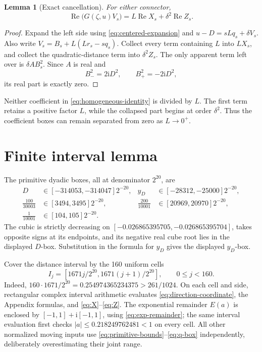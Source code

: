 \documentclass[11pt]{article}
\newtheorem{lemma}[theorem]{Lemma}
\newcommand{\re}{\operatorname{Re}}
\newcommand{\ii}{\mathrm i}
\begin{document}
\begin{lemma}[Exact cancellation]\label{lem:cancellation}
For either connector,
\begin{equation}\label{eq:homogeneous-identity}
 \re\bigl(G(\zeta,u)V_s\bigr)=L\re X_s+\delta^2\re Z_s.
\end{equation}
\end{lemma}

\begin{proof}
Expand the left side using \eqref{eq:centered-expansion} and
\(u-D=sLq_s+\delta V_s\). Also write
\(V_s=B_s+L(Lr_s-sq_s)\). Collect every term containing \(L\) into
\(LX_s\), and collect the quadratic-distance term into \(\delta^2Z_s\).
The only apparent term left over is \(\delta AB_s^2\). Since \(A\) is real and
\[
 B_-^2=2\ii D^2,\qquad B_+^2=-2\ii D^2,
\]
its real part is exactly zero.
\end{proof}

Neither coefficient in \eqref{eq:homogeneous-identity} is divided by \(L\). The first term
retains a positive factor \(L\), while the collapsed part begins at order \(\delta^2\).
Thus the coefficient boxes can remain separated from zero as \(L\to0^+\).

\section{Finite interval lemma}

The primitive dyadic boxes, all at denominator \(2^{20}\), are
\begin{align*}
 D&\in[-314053,-314047]2^{-20},&
 y_D&\in[-28312,-25000]2^{-20},\\
 \frac{100}{30003}&\in[3494,3495]2^{-20},&
 \frac{200}{10001}&\in[20969,20970]2^{-20},\\
 \frac1{10001}&\in[104,105]2^{-20}.&&
\end{align*}
The cubic is strictly decreasing on
\([-0.026865395705,-0.026865395704]\), takes opposite signs at its endpoints,
and its negative real cube root lies in the displayed \(D\)-box. Substitution in the
formula for \(y_D\) gives the displayed \(y_D\)-box.

Cover the distance interval by the 160 uniform cells
\[
 I_j=[1671j/2^{20},1671(j+1)/2^{20}],\qquad 0\leq j<160.
\]
Indeed, \(160\cdot1671/2^{20}=0.254974365234375>261/1024\).
On each cell and side, rectangular complex interval arithmetic evaluates
\eqref{eq:direction-coordinate}, the Appendix formulas, and \eqref{eq:X}--\eqref{eq:Z}.
The exponential remainder \(E(a)\) is enclosed by
\([-1,1]+\ii[-1,1]\), using \eqref{eq:exp-remainder}; the same interval evaluation first
checks \(|a|\leq0.218249762481<1\) on every cell. All other normalized moving
inputs use \eqref{eq:primitive-bounds}--\eqref{eq:q-box} independently, deliberately
overestimating their joint range.
\end{document}
